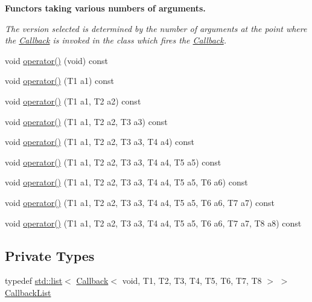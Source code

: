 \begin{Indent}{\bf Functors taking various numbers of arguments.}\par
{\em The version selected is determined by the number of arguments at the point where the \hyperlink{classns3_1_1Callback}{Callback} is invoked in the class which fires the \hyperlink{classns3_1_1Callback}{Callback}. }\begin{DoxyCompactItemize}
\item 
void \hyperlink{classns3_1_1TracedCallback_a7986bf2c7f16e127e94cc7fc822bc321}{operator()} (void) const 
\item 
void \hyperlink{classns3_1_1TracedCallback_a8128f54d8bec81a0427bf71a293466ca}{operator()} (T1 a1) const 
\item 
void \hyperlink{classns3_1_1TracedCallback_aafdef3558a23657c76c330c96f06da6f}{operator()} (T1 a1, T2 a2) const 
\item 
void \hyperlink{classns3_1_1TracedCallback_a4b3705a00ada1d5bdb55a5b65c111a6c}{operator()} (T1 a1, T2 a2, T3 a3) const 
\item 
void \hyperlink{classns3_1_1TracedCallback_abc40bdb8da5b083dbb530d36271a122d}{operator()} (T1 a1, T2 a2, T3 a3, T4 a4) const 
\item 
void \hyperlink{classns3_1_1TracedCallback_a84c9a0f933059d2c6e28d4170a07305f}{operator()} (T1 a1, T2 a2, T3 a3, T4 a4, T5 a5) const 
\item 
void \hyperlink{classns3_1_1TracedCallback_a9ac8b47043d5595a39e17c4b24bc227c}{operator()} (T1 a1, T2 a2, T3 a3, T4 a4, T5 a5, T6 a6) const 
\item 
void \hyperlink{classns3_1_1TracedCallback_abbe3ea9f6c45f9f490a20264a673a2a4}{operator()} (T1 a1, T2 a2, T3 a3, T4 a4, T5 a5, T6 a6, T7 a7) const 
\item 
void \hyperlink{classns3_1_1TracedCallback_a88840c1542430652db66cc75b9dd7b88}{operator()} (T1 a1, T2 a2, T3 a3, T4 a4, T5 a5, T6 a6, T7 a7, T8 a8) const 
\end{DoxyCompactItemize}
\end{Indent}
\subsection*{Private Types}
\begin{DoxyCompactItemize}
\item 
typedef \hyperlink{openflow-interface_8h_afd9bcfa176617760671b67580f536fa7}{std\+::list}$<$ \hyperlink{classns3_1_1Callback}{Callback}$<$ void, T1, T2, T3, T4, T5, T6, T7, T8 $>$ $>$ \hyperlink{classns3_1_1TracedCallback_a0c8f608ad1d2f8a59df1c7cbfedcc847}{Callback\+List}
\end{DoxyCompactItemize}
